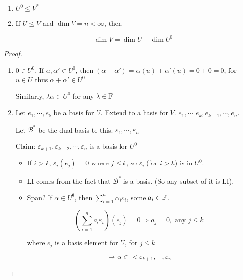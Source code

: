 \documentclass[a4paper]{article}
\begin{document}
 
 \begin{lemma} 
 	\begin{enumerate}
 		\item $ U^{0} \leq V^{*} $
 		\item If $ U \leq V $ and $ \dim V = n < \infty $, then
 		
 		\[ \dim V = \dim U + \dim U^{0} \] 
 		
 	\end{enumerate}
 \end{lemma}

\begin{proof}
	\begin{enumerate}
		\item $ 0 \in U^{0} $. If $ \alpha,\alpha' \in U^{0} $, then $ (\alpha + \alpha') = \alpha(u)  + \alpha'(u) = 0 + 0 = 0$, for $ u \in U $ thus $ \alpha + \alpha' \in U^{0} $ 
		
		Similarly, $ \lambda \alpha \in U^{0} $ for any $ \lambda \in \mathbb{F} $
		
		\item Let $ e_{1},\cdots,e_{k} $ be a basis for $ U $. Extend to a basis for $ V $. $ e_{1},\cdots,e_{k},e_{k+1},\cdots,e_{n} $.
		
		Let $ \mathcal{B}^{*} $ be the dual basis to this. $ \varepsilon_{1},\cdots,\varepsilon_{n} $
		
			Claim: $ \varepsilon_{k+1},\varepsilon_{k+2},\cdots,\varepsilon_{n} $ is a basis for $ U^{0} $
			
			\begin{itemize}
				\item If $ i > k $, $ \varepsilon_{i}(e_{j}) = 0 $ where $ j \leq k $, so $ \varepsilon_{i} $ (for $ i > k $) is in $ U^{0} $.
				\item LI comes from the fact that $ \mathcal{B}^{*} $ is a basis. (So any subset of it is LI).
				\item Span? If $ \alpha \in U^{0} $, then $ \sum_{i=1}^{n} \alpha_{i} \varepsilon_{i} $, some $ a_{i} \in \mathbb{F} $. 
				
				
				\[ \left(  \sum_{i=1}^{n} a_{i} \varepsilon_{i} \right) (e_{j}) = 0 \Rightarrow a_{j} = 0 , \text{ any } j \leq k\]
				
				where $ e_{j} $ is a basis element for $ U $, for $ j \leq k $
				
				\[ \Rightarrow \alpha \in < \varepsilon_{k+1},\cdots,\varepsilon_{n} \]
				
			\end{itemize}
		
	\end{enumerate}


\end{proof}
\end{document}
